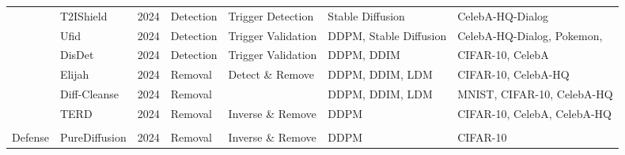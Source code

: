 \begin{table*}[htp]
{\begin{tabular}{p{}p{}p{}p{}p{}p{}p{}}
\cellcolor{white} & T2IShield\cite{wang2024t2ishield} & 2024 & Detection & Trigger Detection & Stable Diffusion & CelebA-HQ-Dialog \\
\cellcolor{white} & Ufid\cite{guan2024ufid} & 2024 & Detection & Trigger Validation & DDPM, Stable Diffusion & CelebA-HQ-Dialog, Pokemon, \\
\cellcolor{white} & DisDet\cite{sui2024disdet} & 2024 & Detection & Trigger Validation & DDPM, DDIM & CIFAR-10, CelebA  \\
\cellcolor{white} & Elijah\cite{an2024elijah} & 2024 & Removal & Detect \& Remove & DDPM, DDIM, LDM & CIFAR-10, CelebA-HQ \\
\cellcolor{white} & Diff-Cleanse\cite{hao2024diff} & 2024 & Removal & & DDPM, DDIM, LDM & MNIST, CIFAR-10, CelebA-HQ \\
\cellcolor{white} & TERD\cite{mo2024terd} & 2024 & Removal & Inverse \& Remove & DDPM & CIFAR-10, CelebA, CelebA-HQ \\
\cellcolor{white}\multirow{-8}{0.1\textwidth}{Backdoor \\ Defense} & PureDiffusion\cite{truong2024purediffusion} & 2024 & Removal & Inverse \& Remove & DDPM & CIFAR-10\\
\hline

\end{tabular}
}
\end{table*}